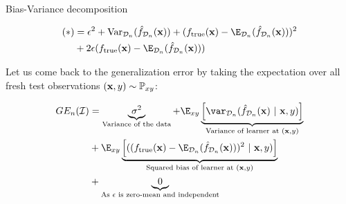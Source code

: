 \documentclass[11pt,compress,t,notes=noshow, xcolor=table]{beamer}
\begin{document}
\begin{framei}[fs=small]{Bias-Variance decomposition}

\item \begin{align*}
  (*) &= \epsilon^2 + \text{Var}_{\D_n}(\fh_{\D_n}(\xv)) + 
  (\ftrue(\xv) - \E_{\D_n}(\fh_{\D_n}(\xv)))^2\\
 &+2 \epsilon (\ftrue(\xv) - \E_{\D_n}(\fh_{\D_n}(\xv)))
 \end{align*}

\item Let us come back to the generalization error by taking the expectation over all fresh test observations $(\mathbf{x}, y) \sim \mathbb{P}_{xy}$: 

\begin{align*}
GE_n(\ind) 
  &= \underbrace{\sigma^2}_{\text{Variance of the data}} + \E_{xy}\underbrace{\left[\var_{\D_n}(\fh_{\D_n}(\xv) ~|~\xv, y)\right]}_{\text{Variance of learner at } (\xv, y)} \\
  &+ \E_{xy}\underbrace{\left[((\ftrue(\xv)-\E_{\D_n}(\fh_{\D_n}(\xv)))^2~|~\xv, y)\right]}_{\text{Squared bias of learner at } (\xv, y)} \\
  &+ \underbrace{0}_{\text{As $\epsilon$ is zero-mean and independent}}
\end{align*}



\end{framei}



\endlecture
\end{document}
